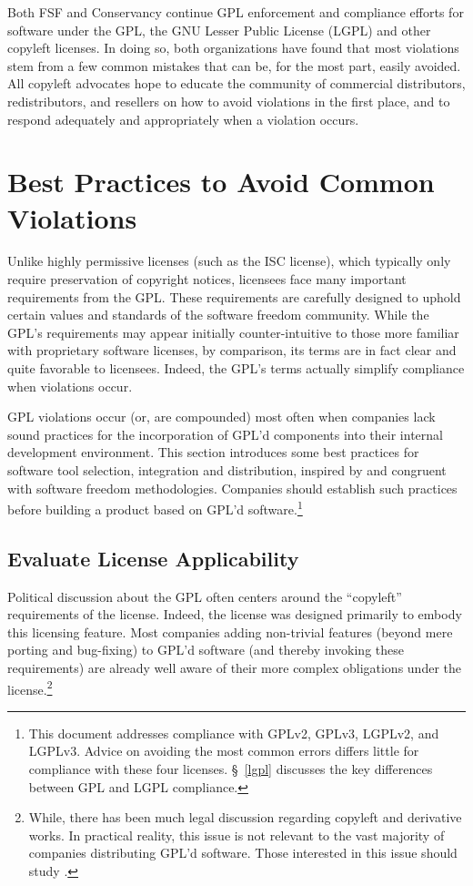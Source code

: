Both FSF and Conservancy continue GPL enforcement and compliance efforts
for software under the GPL, the GNU Lesser
Public License (LGPL) and other copyleft licenses.  In doing so, both organizations have
found that most violations stem from a few common mistakes that can be,
for the most part, easily avoided.  All copyleft advocates  hope to educate the community of
commercial distributors, redistributors, and resellers on how to avoid
violations in the first place, and to respond adequately and appropriately
when a violation occurs.

\chapter{Best Practices to Avoid Common Violations}
\label{best-practices}

Unlike highly permissive licenses (such as the ISC license), which
typically only require preservation of copyright notices, licensees face many
important requirements from the GPL.  These requirements are
carefully designed to uphold certain values and standards of the software
freedom community.  While the GPL's requirements may appear initially
counter-intuitive to those more familiar with proprietary software
licenses, by comparison, its terms are in fact clear and quite favorable to
licensees.  Indeed, the GPL's terms actually simplify compliance when
violations occur.

GPL violations occur (or, are compounded) most often when companies lack sound
practices for the incorporation of GPL'd components into their
internal development environment.  This section introduces some best
practices for software tool selection, integration and distribution,
inspired by and congruent with software freedom methodologies.  Companies should
establish such practices before building a product based on GPL'd
software.\footnote{This document addresses compliance with GPLv2,
  GPLv3, LGPLv2, and LGPLv3.  Advice on avoiding the most common
  errors differs little for compliance with these four licenses.
  \S~\ref{lgpl} discusses the key differences between GPL and LGPL
  compliance.}

\section{Evaluate License Applicability}
\label{derivative-works}
Political discussion about the GPL often centers around the ``copyleft''
requirements of the license.  Indeed, the license was designed primarily
to embody this licensing feature.  Most companies adding non-trivial
features (beyond mere porting and bug-fixing) to GPL'd software (and
thereby invoking these requirements) are already well aware of their
more complex obligations under the license.\footnote{While, there has been much legal
  discussion regarding copyleft and derivative works.  In practical
  reality, this issue is not relevant to the vast majority of companies
  distributing GPL'd software.  Those interested in this issue should study
  .}

